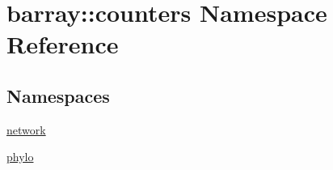 \hypertarget{namespacebarray_1_1counters}{}\section{barray\+:\+:counters Namespace Reference}
\label{namespacebarray_1_1counters}
\subsection*{Namespaces}
\begin{DoxyCompactItemize}
\item 
 \hyperlink{namespacebarray_1_1counters_1_1network}{network}
\item 
 \hyperlink{namespacebarray_1_1counters_1_1phylo}{phylo}
\end{DoxyCompactItemize}
